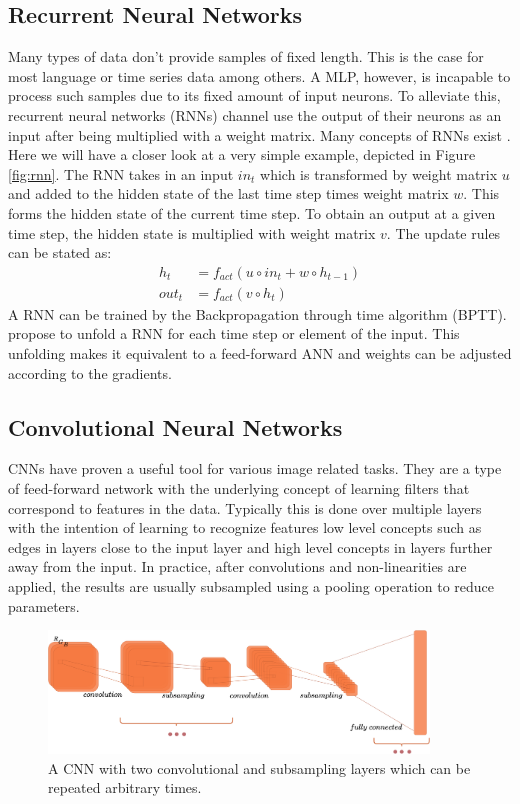 \documentclass[a4paper,cleardoubleempty,BCOR1cm, 11pt]{report}
\begin{document}
\subsection{Recurrent Neural Networks}
Many types of data don't provide samples of fixed length. This is the case for most language or time series data among others. A MLP, however, is incapable to process such samples due to its fixed amount of input neurons. To alleviate this, recurrent neural networks (RNNs) channel use the output of their neurons as an input after being multiplied with a weight matrix. Many concepts of RNNs exist \cite{Grossberg:2013}. Here we will have a closer look at a very simple example, depicted in Figure \ref{fig:rnn}.
The  RNN takes in an input $in_t$ which is transformed by weight matrix $u$ and added to the hidden state of the last time step times weight matrix $w$. This forms the hidden state of the current time step. To obtain an output at a given time step, the hidden state is multiplied with weight matrix $v$. The update rules can be stated as:
\begin{align}
	h_t &= f_{act}(u \circ in_t + w \circ h_{t-1})\\
	out_t &=f_{act}(v \circ h_t)
\end{align}
A RNN can be trained by the Backpropagation through time algorithm (BPTT). \citet{werbos1990backpropagation} propose to unfold a RNN for each time step or element of the input. This unfolding makes it equivalent to a feed-forward ANN and weights can be adjusted according to the gradients.


\subsection{Convolutional Neural Networks}
CNNs have proven a useful tool for various image related tasks. They are a type of feed-forward network with the underlying concept of learning filters that correspond to features in the data. Typically this is done over multiple layers with the intention of learning to recognize features low level concepts such as edges in layers close to the input layer and high level concepts in layers further away from the input. In practice, after convolutions and non-linearities are applied, the results are usually subsampled using a pooling operation to reduce parameters.

\begin{figure}
	\centering
		\includegraphics[width=0.9\textwidth]{images/convnet.pdf} 
		\caption{A CNN with two convolutional and subsampling layers which can be repeated arbitrary times.}
		\label{fig:convnet}
\end{figure}
\end{document}
